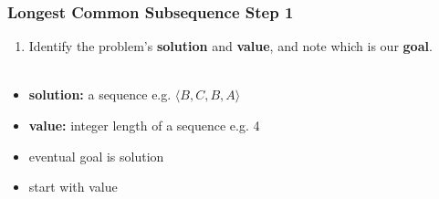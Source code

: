 \documentclass[10pt,aspectratio=169]{beamer}
\newcommand{\stanza}{ \\~\ }
\begin{document}
  \begin{frame} \frametitle{Longest Common Subsequence Step 1}
    \begin{enumerate}
      \item Identify the problem's \textbf{solution} and \textbf{value}, and note which is our \textbf{goal}.
      \stanza
    \end{enumerate}

    \begin{itemize}
      \item \textbf{solution:} a sequence e.g. $\langle B, C, B, A \rangle$
      \item \textbf{value:} integer length of a sequence e.g. 4
      \item eventual goal is solution
      \item start with value
    \end{itemize}
  \end{frame}
  
\end{document}
